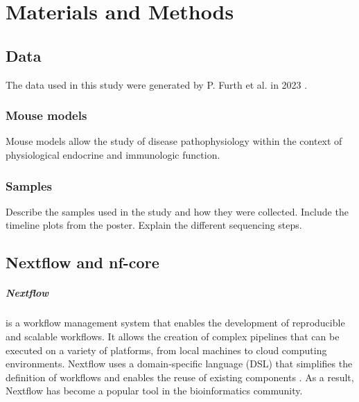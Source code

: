 \chapter{Materials and Methods}
\label{chap:materials_and_methods}

\section{Data}
\label{sec:data}
The data used in this study were generated by P.
Furth et al.
in 2023
\supercite{furth_esr1_2023,furth_overexpression_2023}.

\subsection{Mouse models}
Mouse models allow the study of disease pathophysiology within the context of
physiological endocrine and immunologic function.

\subsection{Samples}
Describe the samples used in the study and how they were collected.
Include the timeline plots from the poster.
Explain the different sequencing steps.

\section{Nextflow and nf-core}
\label{sec:nextflow_and_nf-core}
\paragraph{Nextflow} is a workflow management system that enables the
development of reproducible and scalable workflows.
It allows the creation of complex pipelines that can be executed on a variety
of platforms, from local machines to cloud computing environments.
Nextflow uses a domain-specific language (DSL) that simplifies the definition
of workflows and enables the reuse of existing components
\supercite{di_tommaso_nextflow_2017}.
As a result, Nextflow has become a popular tool in the bioinformatics
community.


